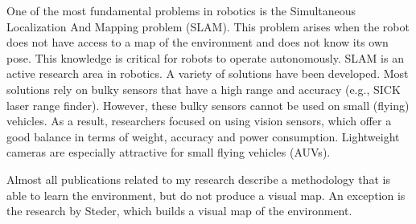 One of the most fundamental problems in robotics is the Simultaneous Localization And Mapping problem (SLAM).
This problem arises when the robot does not have access to a map of the environment and does not know its own pose. 
This knowledge is critical for robots to operate autonomously.
SLAM is an active research area in robotics.
A variety of solutions have been developed.
Most solutions rely on bulky sensors that have a high range and accuracy (e.g., SICK laser range finder).
However, these bulky sensors cannot be used on small (flying) vehicles.
As a result, researchers focused on using vision sensors, which offer a good balance in terms of weight, accuracy and power consumption.
Lightweight cameras are especially attractive for small flying vehicles (AUVs).

Almost all publications related to my research describe a methodology that is able to learn the environment, but do not produce a visual map.
An exception is the research by Steder, which builds a visual map of the environment.

